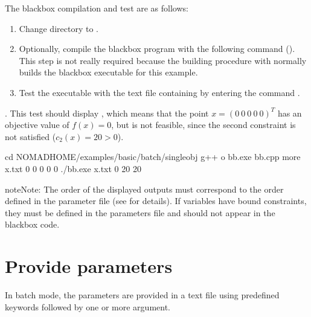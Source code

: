 \documentclass[letterpaper,10pt,english]{sphinxmanual}
\begin{document}
\sphinxAtStartPar
The blackbox compilation and test are as follows:
\begin{enumerate}
%
\item {} 
\sphinxAtStartPar
Change directory to .

\item {} 
\sphinxAtStartPar
Optionally, compile the blackbox program with the following command  (). This step is not really required because the building procedure with  normally builds the blackbox executable for this example.

\item {} 
\sphinxAtStartPar
Test the executable with the text file  containing  by entering the command .

\end{enumerate}

. This test  should display , which means that the point \(x = (0~0~0~0~0)^T\) has an objective value of \(f(x)=0\),
but is not feasible, since the second constraint is not satisfied (\(c_2(x) = 20 > 0\)).

\begin{sphinxVerbatim}[commandchars=\\\{\}]
\PYGZgt{} cd \PYGZdl{}NOMAD\PYGZus{}HOME/examples/basic/batch/single\PYGZus{}obj
\PYGZgt{} g++ \PYGZhy{}o bb.exe bb.cpp
\PYGZgt{} more x.txt
0 0 0 0 0
\PYGZgt{} ./bb.exe x.txt
0 \PYGZhy{}20 20
\end{sphinxVerbatim}

\begin{sphinxadmonition}{note}{Note:}
\sphinxAtStartPar
The order of the displayed outputs must correspond to the order defined in the parameter file (see {\hyperref[\detokenize{HowToUseNomad:bb-output-type}]{}} for details).
If variables have bound constraints, they must be defined in the parameters file and should not appear in the blackbox code.
\end{sphinxadmonition}


\section{Provide parameters}
\label{\detokenize{GettingStarted:provide-parameters}}\label{\detokenize{GettingStarted:id2}}
\sphinxAtStartPar
In batch mode, the parameters are provided in a text file using predefined keywords followed by one or more argument.
\end{document}
